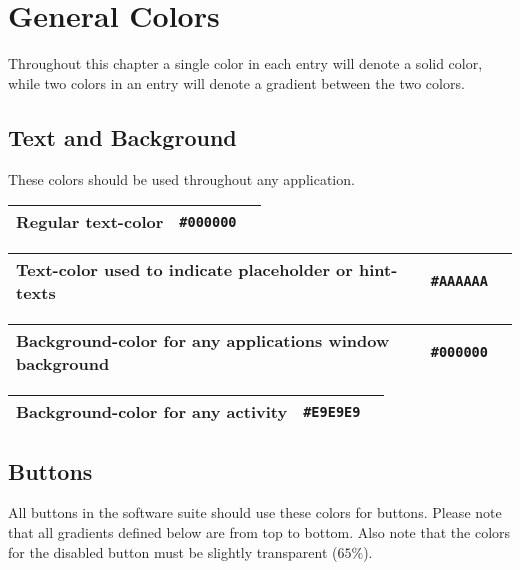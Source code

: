 
\chapter{General Colors}
Throughout this chapter a single color in each entry will denote a solid color, while two colors in an entry will denote a gradient between the two colors.

\section{Text and Background}
These colors should be used throughout any application.

\begin{table}[!htbp]
	\begin{tabularx}{\textwidth}{X r c}
		Regular text-color 
		& \texttt{\#000000} & \cellcolor[HTML]{000000}\phantom{--} \\ \hline
	\end{tabularx}
\end{table}

\begin{table}[!htbp]
	\begin{tabularx}{\textwidth}{X r c}
		Text-color used to indicate placeholder or hint-texts 
		& \texttt{\#AAAAAA} & \cellcolor[HTML]{AAAAAA}\phantom{--} \\ \hline
	\end{tabularx}
\end{table}

\begin{table}[!htbp]
	\begin{tabularx}{\textwidth}{X r c}
		Background-color for any applications window background 
		& \texttt{\#000000} & \cellcolor[HTML]{000000}\phantom{--} \\ \hline
	\end{tabularx}
\end{table}

\begin{table}[!htbp]
	\begin{tabularx}{\textwidth}{X r c}
		Background-color for any activity 
		& \texttt{\#E9E9E9} & \cellcolor[HTML]{E9E9E9}\phantom{--} \\ \hline
	\end{tabularx}
\end{table}

\section{Buttons}
All buttons in the \giraf software suite should use these colors for buttons. Please note that all gradients defined below are from top to bottom. Also note that the colors for the disabled button must be slightly transparent ($65\%$).

